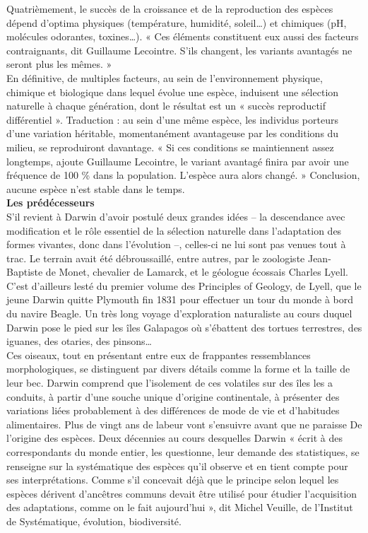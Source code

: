 \documentclass[8pt]{article}
\begin{document}
Quatrièmement, le succès de la croissance et de la reproduction des espèces dépend d’optima physiques (température, humidité, soleil…) et chimiques (pH, molécules odorantes, toxines…). « Ces éléments constituent eux aussi des facteurs contraignants, dit Guillaume Lecointre. S’ils changent, les variants avantagés ne seront plus les mêmes. »\\

En définitive, de multiples facteurs, au sein de l’environnement physique, chimique et biologique dans lequel évolue une espèce, induisent une sélection naturelle à chaque génération, dont le résultat est un « succès reproductif différentiel ». Traduction : au sein d’une même espèce, les individus porteurs d’une variation héritable, momentanément avantageuse par les conditions du milieu, se reproduiront davantage. « Si ces conditions se maintiennent assez longtemps, ajoute Guillaume Lecointre, le variant avantagé finira par avoir une fréquence de 100 \% dans la population. L’espèce aura alors changé. » Conclusion, aucune espèce n’est stable dans le temps.\\

\textbf{Les prédécesseurs}\\

S’il revient à Darwin d’avoir postulé deux grandes idées – la descendance avec modification et le rôle essentiel de la sélection naturelle dans l’adaptation des formes vivantes, donc dans l’évolution –, celles-ci ne lui sont pas venues tout à trac. Le terrain avait été débroussaillé, entre autres, par le zoologiste Jean-Baptiste de Monet, chevalier de Lamarck, et le géologue écossais Charles Lyell. C’est d’ailleurs lesté du premier volume des Principles of Geology, de Lyell, que le jeune Darwin quitte Plymouth fin 1831 pour effectuer un tour du monde à bord du navire Beagle. Un très long voyage d’exploration naturaliste au cours duquel Darwin pose le pied sur les îles Galapagos où s’ébattent des tortues terrestres, des iguanes, des otaries, des pinsons…\\

Ces oiseaux, tout en présentant entre eux de frappantes ressemblances morphologiques, se distinguent par divers détails comme la forme et la taille de leur bec. Darwin comprend que l’isolement de ces volatiles sur des îles les a conduits, à partir d’une souche unique d’origine continentale, à présenter des variations liées probablement à des différences de mode de vie et d’habitudes alimentaires. Plus de vingt ans de labeur vont s’ensuivre avant que ne paraisse De l’origine des espèces. Deux décennies au cours desquelles Darwin « écrit à des correspondants du monde entier, les questionne, leur demande des statistiques, se renseigne sur la systématique des espèces qu’il observe et en tient compte pour ses interprétations. Comme s’il concevait déjà que le principe selon lequel les espèces dérivent d’ancêtres communs devait être utilisé pour étudier l’acquisition des adaptations, comme on le fait aujourd’hui », dit Michel Veuille, de l’Institut de Systématique, évolution, biodiversité.\\
\end{document}
